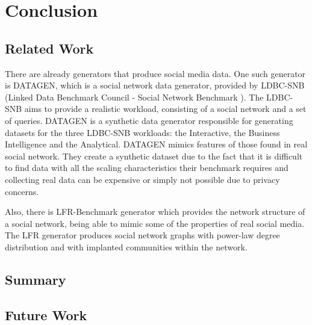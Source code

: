 \chapter{Conclusion}

\section{Related Work}

There are already generators that produce social media data. One such generator is DATAGEN, which is a social network data generator, provided by LDBC-SNB 
(Linked Data Benchmark Council - Social Network Benchmark \cite{26}). The LDBC-SNB aims to provide a realistic workload, consisting of a social network and a set of queries. 
DATAGEN is a synthetic data generator responsible for generating datasets for the three LDBC-SNB workloads: the Interactive, the Business Intelligence and the Analytical. 
DATAGEN mimics features of those found in real social network. They create a synthetic dataset due to the fact that it is difficult to find data with all the 
scaling characteristics their benchmark requires and collecting real data can be expensive or simply not possible due to privacy concerns.

Also, there is LFR-Benchmark generator \cite{27} which provides the network structure of a social network, being able to mimic some of the properties of real 
social media. The LFR generator produces social network graphs with power-law degree distribution and with implanted communities within the network.

\section{Summary}

\section{Future Work}

